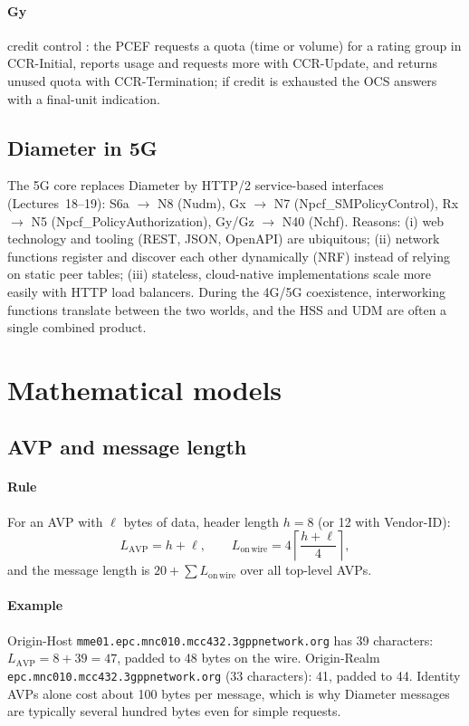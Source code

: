 \documentclass[11pt,a4paper]{article}
\begin{document}
\paragraph{Gy} credit control \cite{rfc8506}: the PCEF requests a quota (time or volume) for a rating group in
CCR-Initial, reports usage and requests more with CCR-Update, and returns unused quota with
CCR-Termination; if credit is exhausted the OCS answers with a final-unit indication.

\subsection{Diameter in 5G}
The 5G core replaces Diameter by HTTP/2 service-based interfaces (Lectures~18--19): S6a $\to$ N8 (Nudm),
Gx $\to$ N7 (Npcf\_SMPolicyControl), Rx $\to$ N5 (Npcf\_PolicyAuthorization), Gy/Gz $\to$ N40 (Nchf). Reasons:
(i) web technology and tooling (REST, JSON, OpenAPI) are ubiquitous; (ii) network functions register and
discover each other dynamically (NRF) instead of relying on static peer tables; (iii) stateless,
cloud-native implementations scale more easily with HTTP load balancers. During the 4G/5G coexistence,
interworking functions translate between the two worlds, and the HSS and UDM are often a single
combined product.

\section{Mathematical models}

\subsection{AVP and message length}\label{sec:len}
\paragraph{Rule} For an AVP with $\ell$ bytes of data, header length $h = 8$ (or 12 with Vendor-ID):
\begin{equation}\label{eq:avplen}
  L_{\mathrm{AVP}} = h + \ell, \qquad
  L_{\mathrm{on\,wire}} = 4\left\lceil \frac{h+\ell}{4}\right\rceil,
\end{equation}
and the message length is $20 + \sum L_{\mathrm{on\,wire}}$ over all top-level AVPs.
\paragraph{Example} Origin-Host \texttt{mme01.epc.mnc010.mcc432.3gppnetwork.org} has 39 characters:
$L_{\mathrm{AVP}} = 8+39 = 47$, padded to 48 bytes on the wire. Origin-Realm
\texttt{epc.mnc010.mcc432.3gppnetwork.org} (33 characters): 41, padded to 44. Identity AVPs alone cost
about 100 bytes per message, which is why Diameter messages are typically several hundred bytes even for
simple requests.
\end{document}

